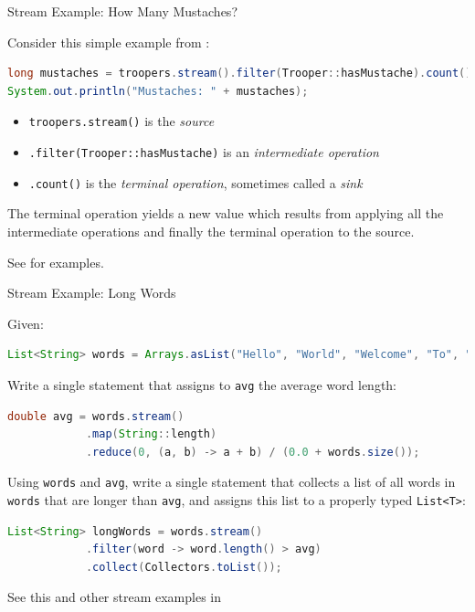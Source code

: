 \documentclass{beamer}
\begin{document}
\begin{frame}[fragile]{Stream Example: How Many Mustaches?}

Consider this simple example from :
\begin{lstlisting}[language=Java]
long mustaches = troopers.stream().filter(Trooper::hasMustache).count();
System.out.println("Mustaches: " + mustaches);
\end{lstlisting}

\begin{itemize}
\item {\tt troopers.stream()} is the {\it source}
\item {\tt .filter(Trooper::hasMustache)} is an {\it intermediate operation}
\item {\tt .count()} is the {\it terminal operation}, sometimes called a {\it sink}
\end{itemize}
The terminal operation yields a new value which results from applying all the intermediate operations and finally the terminal operation to the source.

See  for examples.

\end{frame}

\begin{frame}[fragile]{Stream Example: Long Words}

Given:
\begin{lstlisting}[language=Java]
List<String> words = Arrays.asList("Hello", "World", "Welcome", "To", "Java", "8");
\end{lstlisting}
Write a single statement that assigns to {\tt avg} the average word length:
\begin{lstlisting}[language=Java]
        double avg = words.stream()
            .map(String::length)
            .reduce(0, (a, b) -> a + b) / (0.0 + words.size());
\end{lstlisting}
Using {\tt words} and {\tt avg}, write a single statement that collects a list of all words in {\tt words} that are longer than {\tt avg}, and assigns this  list to a properly typed {\tt List<T>}:
\begin{lstlisting}[language=Java]
        List<String> longWords = words.stream()
            .filter(word -> word.length() > avg)
            .collect(Collectors.toList());
\end{lstlisting}

See this and other stream examples in 

\end{frame}
\end{document}
